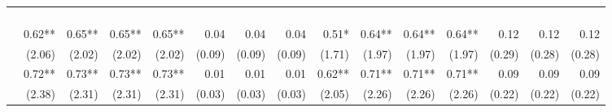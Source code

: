     \begin{tabularx}{1.45\textwidth}{lRRRRRRRRRRRRRR}
        \toprule
        &  &  \\ \cmidrule(rl){2-8} \cmidrule(rl){9-15}
        &  &  &  &  \\
        \cmidrule(rl){2-5} \cmidrule(rl){6-8} \cmidrule(rl){9-12} \cmidrule(rl){13-15}
        &  &  &  &  &  &  &  &  &  &  &  &  &  &  \\
		\midrule
		 \\[\panelspacing]
		 & \num{0.62}**\phantom{*)} & \num{0.65}**\phantom{*)} & \num{0.65}**\phantom{*)} & \num{0.65}**\phantom{*)} & \num{0.04}\phantom{***)} & \num{0.04}\phantom{***)} & \num{0.04}\phantom{***)} & \num{0.51}*\phantom{**)} & \num{0.64}**\phantom{*)} & \num{0.64}**\phantom{*)} & \num{0.64}**\phantom{*)} & \num{0.12}\phantom{***)} & \num{0.12}\phantom{***)} & \num{0.12}\phantom{***)} \\
		 & (\num{2.06})\phantom{***} & (\num{2.02})\phantom{***} & (\num{2.02})\phantom{***} & (\num{2.02})\phantom{***} & (\num{0.09})\phantom{***} & (\num{0.09})\phantom{***} & (\num{0.09})\phantom{***} & (\num{1.71})\phantom{***} & (\num{1.97})\phantom{***} & (\num{1.97})\phantom{***} & (\num{1.97})\phantom{***} & (\num{0.29})\phantom{***} & (\num{0.28})\phantom{***} & (\num{0.28})\phantom{***} \\ [\dspacing]
		 & \num{0.72}**\phantom{*)} & \num{0.73}**\phantom{*)} & \num{0.73}**\phantom{*)} & \num{0.73}**\phantom{*)} & \num{0.01}\phantom{***)} & \num{0.01}\phantom{***)} & \num{0.01}\phantom{***)} & \num{0.62}**\phantom{*)} & \num{0.71}**\phantom{*)} & \num{0.71}**\phantom{*)} & \num{0.71}**\phantom{*)} & \num{0.09}\phantom{***)} & \num{0.09}\phantom{***)} & \num{0.09}\phantom{***)} \\
		 & (\num{2.38})\phantom{***} & (\num{2.31})\phantom{***} & (\num{2.31})\phantom{***} & (\num{2.31})\phantom{***} & (\num{0.03})\phantom{***} & (\num{0.03})\phantom{***} & (\num{0.03})\phantom{***} & (\num{2.05})\phantom{***} & (\num{2.26})\phantom{***} & (\num{2.26})\phantom{***} & (\num{2.26})\phantom{***} & (\num{0.22})\phantom{***} & (\num{0.22})\phantom{***} & (\num{0.22})\phantom{***} \\ [\dspacing]

\end{tabularx}
